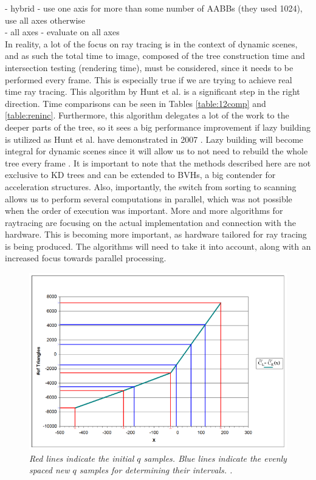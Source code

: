 \documentclass[12pt]{article}
\begin{document}
- hybrid - use one axis for more than some number of AABBs (they used 1024), use all axes otherwise\\
- all axes - evaluate on all axes\\
\indent In reality, a lot of the focus on ray tracing is in the context of dynamic scenes, and as such the total time to image, composed of the tree construction time and intersection testing (rendering time), must be considered, since it needs to be performed every frame. This is especially true if we are trying to achieve real time ray tracing. This algorithm by Hunt et al. \cite{hunt2006fast} is a significant step in the right direction. Time comparisons can be seen in Tables \ref{table:12comp} and \ref{table:reninc}. Furthermore, this algorithm delegates a lot of the work to the deeper parts of the tree, so it sees a big performance improvement if lazy building is utilized as Hunt et al. have demonstrated in 2007 \cite{hunt2007fast}. Lazy building will become integral for dynamic scenes since it will allow us to not need to rebuild the whole tree every frame \cite{shevtsov2007highly}. It is important to note that the methods described here are not exclusive to KD trees and can be extended to BVHs, a big contender for acceleration structures. Also, importantly, the switch from sorting to scanning allows us to perform several computations in parallel, which was not possible when the order of execution was important. More and more algorithms for raytracing are focusing on the actual implementation and connection with the hardware. This is becoming more important, as hardware tailored for ray tracing is being produced. The algorithms will need to take it into account, along with an increased focus towards parallel processing.
\begin{figure}
\centering
\includegraphics[width=12cm]{figs/sampling1}
\caption{\textit{Red lines indicate the initial $q$ samples. Blue lines indicate the evenly spaced new $q$ samples for determining their intervals. \cite[Figure 3]{hunt2006fast}.}}
\label{figure:samp1}
\end{figure}
\end{document}
